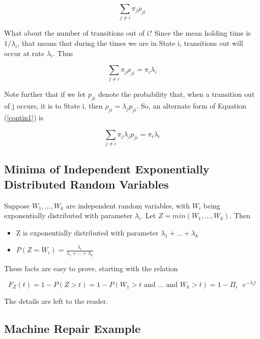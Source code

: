 \documentclass[11pt]{article}
\begin{document}
\begin{equation}
\sum_{j\neq i}\pi_{j}\rho_{ji}
\end{equation}

What about the number of transitions out of i? Since the mean holding
time is $1/\lambda_{i}$, that means that during the times we are in
State i, transitions out will occur at rate $\lambda_{i}$. Thus

\begin{equation}
\label{contin1}
\sum_{j\neq i}\pi_{j}\rho_{ji}=\pi_{i}\lambda_{i}
\end{equation}

Note further that if we let $p_{ji}$ denote the probability that, when a
transition out of j occurs, it is to State i, then $\rho_{ji}=\lambda
_{j}p_{ji}$.  So, an alternate form of Equation (\ref{contin1}) is

\begin{equation}
\sum_{j\neq i}\pi_{j}\lambda_{j}p_{ji}=\pi_{i}\lambda_{i}
\end{equation}

\subsection{\label{min}Minima of Independent Exponentially Distributed
Random Variables}  

Suppose $W_{1},...,W_{k}$ are independent random variables, with $W_{i}$
being exponentially distributed with parameter $\lambda_{i}$.  Let
$Z=min(W_{1},...,W_{k})$. Then

\begin{itemize}

\item Z is exponentially distributed with parameter $\lambda
_{1}+...+\lambda_{k}$

\item $P(Z=W_{i}) = \frac{\lambda_{i}}{\lambda_{1}+...+\lambda_{k}}$ 

\end{itemize}

These facts are easy to prove, starting with the relation

\begin{equation}
F_{Z}(t)=1-P(Z>t)=1-P(W_{1}>t\textrm{ and }...\textrm{ and }W_{k}>t)=
1-\Pi_{i}\textrm{ }e^{-\lambda_{i}t}
\end{equation} 

The details are left to the reader.

\subsection{Machine Repair Example}
\end{document}

